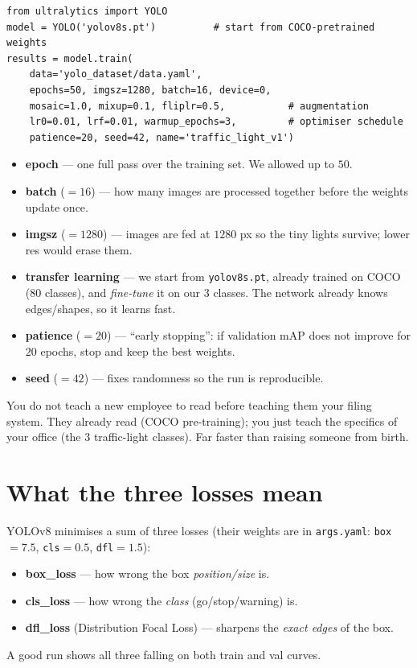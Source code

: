 \begin{verbatim}
from ultralytics import YOLO
model = YOLO('yolov8s.pt')          # start from COCO-pretrained weights
results = model.train(
    data='yolo_dataset/data.yaml',
    epochs=50, imgsz=1280, batch=16, device=0,
    mosaic=1.0, mixup=0.1, fliplr=0.5,           # augmentation
    lr0=0.01, lrf=0.01, warmup_epochs=3,         # optimiser schedule
    patience=20, seed=42, name='traffic_light_v1')
\end{verbatim}

\begin{keyconcept}
\begin{itemize}
  \item \textbf{epoch} --- one full pass over the training set. We allowed
        up to $50$.
  \item \textbf{batch} ($=16$) --- how many images are processed together
        before the weights update once.
  \item \textbf{imgsz} ($=1280$) --- images are fed at $1280$ px so the
        tiny lights survive; lower res would erase them.
  \item \textbf{transfer learning} --- we start from \texttt{yolov8s.pt},
        already trained on COCO (80 classes), and \emph{fine-tune} it on
        our 3 classes. The network already knows edges/shapes, so it
        learns fast.
  \item \textbf{patience} ($=20$) --- ``early stopping'': if validation
        mAP does not improve for $20$ epochs, stop and keep the best
        weights.
  \item \textbf{seed} ($=42$) --- fixes randomness so the run is
        reproducible.
\end{itemize}
\end{keyconcept}

\begin{analogy}
You do not teach a new employee to read before teaching them your filing
system. They already read (COCO pre-training); you just teach the
specifics of your office (the 3 traffic-light classes). Far faster than
raising someone from birth.
\end{analogy}

\section{What the three losses mean}
YOLOv8 minimises a sum of three losses (their weights are in
\texttt{args.yaml}: \texttt{box}$=7.5$, \texttt{cls}$=0.5$,
\texttt{dfl}$=1.5$):
\begin{itemize}
  \item \textbf{box\_loss} --- how wrong the box \emph{position/size} is.
  \item \textbf{cls\_loss} --- how wrong the \emph{class}
        (go/stop/warning) is.
  \item \textbf{dfl\_loss} (Distribution Focal Loss) --- sharpens the
        \emph{exact edges} of the box.
\end{itemize}
A good run shows all three falling on both train and val curves.

